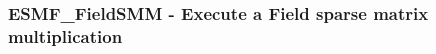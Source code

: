  
\setlength{\oldparskip}{\parskip}
\setlength{\parskip}{1.5ex}
\setlength{\oldparindent}{\parindent}
\setlength{\parindent}{0pt}
\setlength{\oldbaselineskip}{\baselineskip}
\setlength{\baselineskip}{11pt}
 
\def\bv{\begin{verbatim}}
\def\ev{\end{verbatim}}
\def\be{\begin{equation}}
\def\ee{\end{equation}}
\def\bea{\begin{eqnarray}}
\def\eea{\end{eqnarray}}
\def\bi{\begin{itemize}}
\def\ei{\end{itemize}}
\def\bn{\begin{enumerate}}
\def\en{\end{enumerate}}
\def\bd{\begin{description}}
\def\ed{\end{description}}
\def\({\left (}
\def\){\right )}
\def\[{\left [}
\def\]{\right ]}
\def\<{\left  \langle}
\def\>{\right \rangle}
\def\cI{{\cal I}}
\def\diag{\mathop{\rm diag}}
\def\tr{\mathop{\rm tr}}


 
\subsubsection [ESMF\_FieldSMM] {ESMF\_FieldSMM - Execute a Field sparse matrix multiplication}


